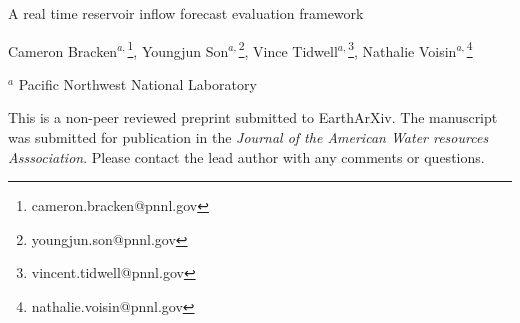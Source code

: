 \documentclass[a4paper]{article}
\begin{document}

\Large
 \begin{center}
A real time reservoir inflow forecast evaluation framework\\ 

\hspace{10pt}

\large



Cameron Bracken$^{a,}$\footnote{cameron.bracken@pnnl.gov}, 
Youngjun Son$^{a,}$\footnote{youngjun.son@pnnl.gov}, 
Vince Tidwell$^{a,}$\footnote{vincent.tidwell@pnnl.gov},
Nathalie Voisin$^{a,}$\footnote{nathalie.voisin@pnnl.gov}\\

\hspace{10pt}

\small  
$^a$ Pacific Northwest National Laboratory

\end{center}

\normalsize 

This is a non-peer reviewed preprint submitted to EarthArXiv. The manuscript was submitted for publication in the \textit{Journal of the American Water resources Asssociation}. Please contact the lead author with any comments or questions. 
\end{document}
